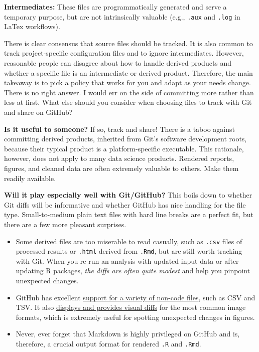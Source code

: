 \documentclass[12pt]{article}
\providecommand{\tightlist}{%
  \setlength{\itemsep}{0pt}\setlength{\parskip}{0pt}}
\begin{document}
\textbf{Intermediates:} These files are programmatically generated and
serve a temporary purpose, but are not intrinsically valuable (e.g.,
\texttt{.aux} and \texttt{.log} in LaTex workflows).

There is clear consensus that source files should be tracked. It is also
common to track project-specific configuration files and to ignore
intermediates. However, reasonable people can disagree about how to
handle derived products and whether a specific file is an intermediate
or derived product. Therefore, the main takeaway is to pick a policy
that works for you and adapt as your needs change. There is no right
answer. I would err on the side of committing more rather than less at
first. What else should you consider when choosing files to track with
Git and share on GitHub?

\textbf{Is it useful to someone?} If so, track and share! There is a
taboo against committing derived products, inherited from Git's software
development roots, because their typical product is a platform-specific
executable. This rationale, however, does not apply to many data science
products. Rendered reports, figures, and cleaned data are often
extremely valuable to others. Make them readily available.

\textbf{Will it play especially well with Git/GitHub?} This boils down
to whether Git diffs will be informative and whether GitHub has nice
handling for the file type. Small-to-medium plain text files with hard
line breaks are a perfect fit, but there are a few more pleasant
surprises.

\begin{itemize}
\tightlist
\item
  Some derived files are too miserable to read casually, such as
  \texttt{.csv} files of processed results or \texttt{.html} derived
  from \texttt{.Rmd}, but are still worth tracking with Git. When you
  re-run an analysis with updated input data or after updating R
  packages, \emph{the diffs are often quite modest} and help you
  pinpoint unexpected changes.
\item
  GitHub has excellent
  \href{https://help.github.com/categories/working-with-non-code-files/}{support
  for a variety of non-code files}, such as CSV and TSV. It also
  \href{https://help.github.com/articles/rendering-and-diffing-images/}{displays
  and provides visual diffs} for the most common image formats, which is
  extremely useful for spotting unexpected changes in figures.
\item
  Never, ever forget that Markdown is highly privileged on GitHub and
  is, therefore, a crucial output format for rendered \texttt{.R} and
  \texttt{.Rmd}.
\end{itemize}
\end{document}

